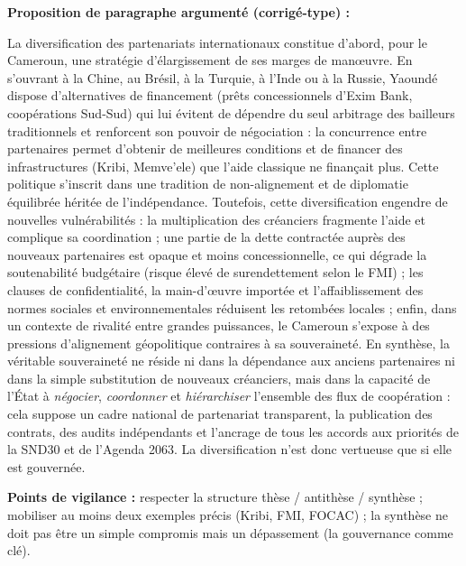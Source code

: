 \documentclass[11pt]{article}
\begin{document}
\begin{corrige}
\textbf{Proposition de paragraphe argumenté (corrigé-type) :}

La diversification des partenariats internationaux constitue d'abord, pour le Cameroun, une stratégie d'élargissement de ses marges de manœuvre. En s'ouvrant à la Chine, au Brésil, à la Turquie, à l'Inde ou à la Russie, Yaoundé dispose d'alternatives de financement (prêts concessionnels d'Exim Bank, coopérations Sud-Sud) qui lui évitent de dépendre du seul arbitrage des bailleurs traditionnels et renforcent son pouvoir de négociation : la concurrence entre partenaires permet d'obtenir de meilleures conditions et de financer des infrastructures (Kribi, Memve'ele) que l'aide classique ne finançait plus. Cette politique s'inscrit dans une tradition de non-alignement et de diplomatie équilibrée héritée de l'indépendance. Toutefois, cette diversification engendre de nouvelles vulnérabilités : la multiplication des créanciers fragmente l'aide et complique sa coordination ; une partie de la dette contractée auprès des nouveaux partenaires est opaque et moins concessionnelle, ce qui dégrade la soutenabilité budgétaire (risque élevé de surendettement selon le FMI) ; les clauses de confidentialité, la main-d'œuvre importée et l'affaiblissement des normes sociales et environnementales réduisent les retombées locales ; enfin, dans un contexte de rivalité entre grandes puissances, le Cameroun s'expose à des pressions d'alignement géopolitique contraires à sa souveraineté. En synthèse, la véritable souveraineté ne réside ni dans la dépendance aux anciens partenaires ni dans la simple substitution de nouveaux créanciers, mais dans la capacité de l'État à \emph{négocier}, \emph{coordonner} et \emph{hiérarchiser} l'ensemble des flux de coopération : cela suppose un cadre national de partenariat transparent, la publication des contrats, des audits indépendants et l'ancrage de tous les accords aux priorités de la SND30 et de l'Agenda 2063. La diversification n'est donc vertueuse que si elle est gouvernée.

\textbf{Points de vigilance :} respecter la structure thèse / antithèse / synthèse ; mobiliser au moins deux exemples précis (Kribi, FMI, FOCAC) ; la synthèse ne doit pas être un simple compromis mais un dépassement (la gouvernance comme clé).
\end{corrige}
\end{document}
